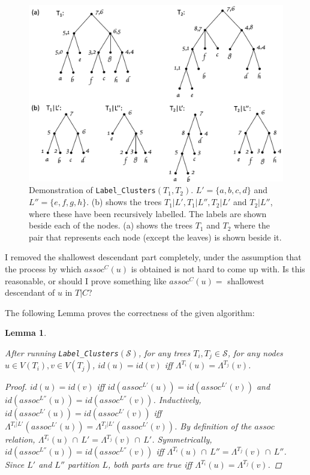 \documentclass{article}
\newcommand{\leafset}{\Lambda}
\newtheorem{labelclusterscorrectness}[incompatibility]{Lemma}
\begin{document}
    \begin{figure}[h]
        \includegraphics[scale=0.5]{labelclusters}
        \centering
        \caption{Demonstration of \texttt{Label\_Clusters}$(T_1, T_2)$. $L' = \{a, b, c, d\}$ and $L'' = \{e, f, g, h\}$. (b) shows the trees $T_1|L', T_1|L'', T_2|L'$ and $T_2|L''$, where these have been recursively labelled. The labels are shown beside each of the nodes. (a) shows the trees $T_1$ and $T_2$ where the pair that represents each node (except the leaves) is shown beside it.}
        \label{fig:labelclusters}
    \end{figure}

    {\color{red} I removed the shallowest descendant part completely, under the assumption that the process by which $assoc^C(u)$ is obtained is not hard to come up with. Is this reasonable, or should I prove something like $assoc^C(u) = $ shallowest descendant of $u$ in $T|C$?}

    The following Lemma proves the correctness of the given algorithm:

    \bigskip
    \begin{labelclusterscorrectness}
        \label{lem:labelclusterscorrectness}

        After running \texttt{Label\_Clusters}$(\mathcal{S})$, for any trees $T_i, T_j \in \mathcal{S}$, for any nodes $u \in V(T_i), v \in V(T_j)$, $id(u) = id(v)$ iff $\leafset^{T_i}(u) = \leafset^{T_j}(v)$.

        \begin{proof}
            $id(u) = id(v)$ iff $id(assoc^{L'}(u)) = id(assoc^{L'}(v))$ and $id(assoc^{L''}(u)) = id(assoc^{L''}(v))$. Inductively, $id(assoc^{L'}(u)) = id(assoc^{L'}(v))$ iff $\leafset^{T_i|L'}(assoc^{L'}(u)) = \leafset^{T_j|L'}(assoc^{L'}(v))$. By definition of the $assoc$ relation, $\leafset^{T_i}(u)\, \cap\, L' = \leafset^{T_j}(v)\, \cap\, L'$. Symmetrically, $id(assoc^{L''}(u)) = id(assoc^{L''}(v))$ iff $\leafset^{T_i}(u)\, \cap\, L'' = \leafset^{T_j}(v)\, \cap\, L''$. Since $L'$ and $L''$ partition $L$, both parts are true iff $\leafset^{T_i}(u) = \leafset^{T_j}(v)$.
        \end{proof}
    \end{labelclusterscorrectness}
\end{document}
